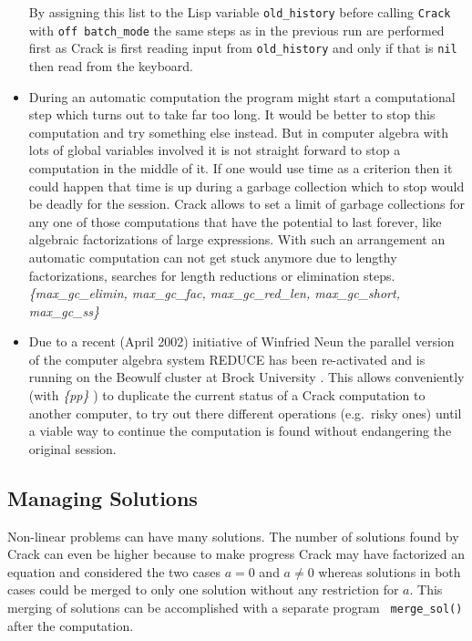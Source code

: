 \documentclass[12pt]{article}
\begin{document}
\begin{itemize}
    By assigning this list to the {\sc Lisp} variable {\tt old\_history}
    before calling {\tt Crack} with {\tt off batch\_mode} the same steps
    as in the previous run are performed
    first as {\sc Crack} is first reading input from {\tt old\_history}
    and only if that is {\tt nil} then read from the keyboard.
  \item During an automatic computation the program might start a
    computational step which turns out to take far too long. It would
    be better to stop this computation and try something else instead.
    But in computer algebra with lots of global variables involved it
    is not straight forward to stop a computation in the middle of it.
    If one would use time as a criterion then it could happen that
    time is up during a garbage collection which to stop would
    be deadly for the session. {\sc Crack} allows to
    set a limit of garbage collections for any one of those
    computations that have the potential to last forever, like
    algebraic factorizations of large expressions.
    With such an arrangement an automatic computation
    can not get stuck anymore due to lengthy factorizations, searches
    for length reductions or elimination steps.
    {\em \{max\_gc\_elimin, max\_gc\_fac, max\_gc\_red\_len,
    max\_gc\_short, max\_gc\_ss\} }
  \item Due to a recent (April 2002) initiative of Winfried Neun the
    parallel version of the computer algebra system REDUCE has been
    re-activated and is running on the Beowulf cluster at Brock
    University \cite{MelNeun}. This allows conveniently (with {\em
    \{pp\} }) to duplicate the current status of a {\sc Crack}
    computation to another computer, to try out there different
    operations (e.g.\ risky ones) until a viable way to continue the
    computation is found without endangering the original session.
  \end{itemize}

\subsection{Managing Solutions}
  Non-linear problems can have many solutions. The number of solutions
  found by {\sc Crack} can even be higher because to make progress
  {\sc Crack} may have factorized an equation and considered the two
  cases $a=0$ and $a \neq 0$ whereas solutions in both cases could be
  merged to only one solution without any restriction for $a$. This merging
  of solutions can be accomplished with a separate program {\tt
  merge\_sol()} after the computation.
\end{document}
